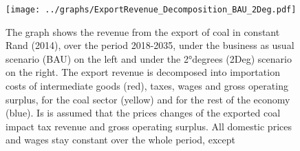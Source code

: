 \documentclass[12pt,english]{article}
\begin{document}

\begin{figure}[!b]
	\hspace{-10pt}\texttt{[image: ../graphs/ExportRevenue\_Decomposition\_BAU\_2Deg.pdf]}
	\caption{\label{ExportRevenue_Decomposition_Diff}\small The graph shows the revenue from the export of coal in constant Rand (2014), over the period 2018-2035, under the business as usual scenario (BAU) on the left and under the 2°degrees (2Deg) scenario on the right. The export revenue is decomposed into importation costs of intermediate goods (red), taxes, wages and gross operating surplus, for the coal sector (yellow) and for the rest of the economy (blue). Is is assumed that the prices changes of the exported coal impact tax revenue and gross operating surplus. All domestic prices and wages stay constant over the whole period, except  }
\end{figure}
\end{document}
